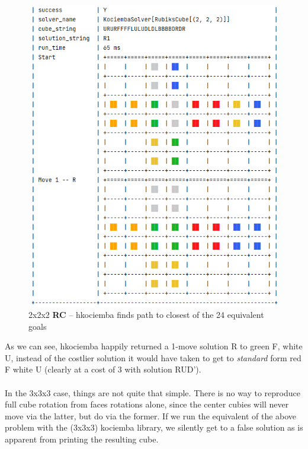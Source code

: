 \begin{figure}[H]
\centering
\includegraphics[scale=0.6]{./Figures/KociembaBug222}
\caption[Kociemba Bug]{2x2x2 \textbf{RC} -- hkociemba finds path to closest of the 24 equivalent goals}
\label{fig:KociembaBug222}
\end{figure}
As we can see, hkociemba happily returned a 1-move solution R to green F, white U, instead of the costlier solution it would have taken to get to \textit{standard} form red F white U (clearly at a cost of 3 with solution RUD').
\\
\\
In the 3x3x3 case, things are not quite that simple. There is no way to reproduce full cube rotation from faces rotations alone, since the center cubies will never move via the latter, but do via the former. If we run the equivalent of the above problem with the (3x3x3) kociemba library, we silently get to a false solution as is apparent from printing the resulting cube.
\afblue
